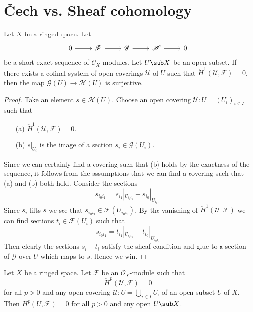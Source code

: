 \section{\v{C}ech vs. Sheaf cohomology}
\begin{proposition}\label{Cech exact section}
Let $X$ be a ringed space. Let
\[\begin{tikzcd}
0\ar[r]&\mathscr{F}\ar[r]&\mathscr{G}\ar[r]&\mathscr{H}\ar[r]&0
\end{tikzcd}\]
be a short exact sequence of $\mathscr{O}_X$-modules. Let $U\sub X$ be an open subset. If there exists a cofinal system of open coverings $\mathcal{U}$ of $U$ such that 
$\check{H}^1(\mathcal{U},\mathscr{F})=0$, then the map $\mathscr{G}(U)\to\mathscr{H}(U)$ is surjective.
\end{proposition}
\begin{proof}
Take an element $s\in\mathscr{H}(U)$. Choose an open covering $\mathcal{U}:U=(U_i)_{i\in I}$ such that 
\begin{itemize}
\item[(a)] $\check{H}^1(\mathcal{U},\mathscr{F})=0$.
\item[(b)] $s|_{U_i}$ is the image of a section $s_i\in\mathscr{G}(U_i)$.
\end{itemize} 
Since we can certainly find a covering such that (b) holds by the exactness of the sequence, it follows from the assumptions that we can find a covering such that (a) and (b) both hold. Consider the sections
\[s_{i_0i_1}=s_{i_1}|_{U_{i_0i_1}}-s_{i_0}|_{U_{i_0i_1}}\]
Since $s_i$ lifts $s$ we see that $s_{i_0i_1}\in\mathscr{F}(U_{i_0i_1})$. By the vanishing of $\check{H}^1(\mathcal{U},\mathscr{F})$ we can find sections $t_i\in\mathscr{F}(U_i)$ such that
\[s_{i_0i_1}=t_{i_1}|_{U_{i_0i_1}}-t_{i_0}|_{U_{i_0i_1}}\]
Then clearly the sections $s_i-t_i$ satisfy the sheaf condition and glue to a section of $\mathscr{G}$ over $U$ which maps to $s$. Hence we win.
\end{proof}
\begin{proposition}\label{Cech vanish H^p vanish}
Let $X$ be a ringed space. Let $\mathscr{F}$ be an $\mathscr{O}_X$-module such that
\[\check{H}^p(\mathcal{U},\mathscr{F})=0\]
for all $p>0$ and any open covering $\mathcal{U}:U=\bigcup_{i\in I}U_i$ of an open subset $U$ of $X$. Then $H^p(U,\mathscr{F})=0$ for all $p>0$ and any open $U\sub X$.
\end{proposition}
